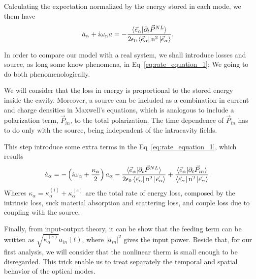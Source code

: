 Calculating the expectation %
normalized by the energy stored in each mode, we them have 
\begin{equation}
    \dot{a}_\alpha + i \omega_\alpha a = -\frac{\braket{\vec{e}_\alpha|\partial_t\vec{P}^{NL}}}{2\epsilon_0\bra{\vec{e}_\alpha}\text{n}^2\ket{\vec{e}_\alpha}}.
    \label{eq:rate_equation_1}
\end{equation}

In order to compare our model with a real system, we shall introduce losses and source, as long some know phenomena, in Eq~\ref{eq:rate_equation_1}; We going to do both phenomenologically.

We will consider that the loss in energy is proportional to the stored energy inside the cavity. Moreover, a source can be included as a combination in current and charge densities in Maxwell's equations, which is analogous to include a polarization term, $\vec{P}_{in}$, to the total polarization. The time dependence of $\vec{P}_{in}$ has to do only with the source, being independent of the intracavity fields.

This step introduce some extra terms in the Eq~\ref{eq:rate_equation_1}, which results
\begin{equation}
    \dot{a}_\alpha = -\left(i\omega_\alpha +\frac{\kappa_\alpha}{2}\right)a_\alpha -\frac{\braket{\vec{e}_\alpha|\partial_t\vec{P}^{NL}}}{2\epsilon_0\bra{\vec{e}_\alpha}\text{n}^2\ket{\vec{e}_\alpha}}+\frac{\braket{\vec{e}_\alpha|\partial_t\vec{P}_{in}}}{\bra{\vec{e}_\alpha}\text{n}^2\ket{\vec{e}_\alpha}}.
\end{equation}
Wheres $\kappa_\alpha = \kappa^{(i)}_\alpha+\kappa^{(e)}_\alpha$ are the total rate of energy loss, composed by the intrinsic loss, suck material absorption and scattering loss, and couple loss due to coupling with the source. 

Finally, from input-output theory, it can be show that the feeding term can be written as $\sqrt{\kappa^{(e)}_\alpha}a_{in}(t)$, where $|a_{in}|^2$ gives the input power. Beside that, for our first analysis, we will consider that the nonlinear therm is small enough to be disregarded. This trick enable us to treat separately the temporal and spatial behavior of the optical modes. 


